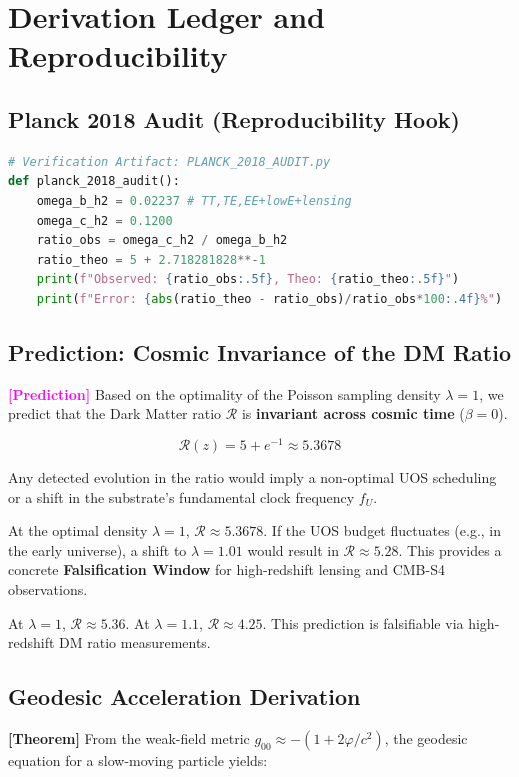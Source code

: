 \documentclass[11pt,titlepage]{article}
\newcommand{\tagtheo}{\textcolor{green!60!black}{\textbf{[Theorem]}} }
\newcommand{\tagpred}{\textcolor{magenta}{\textbf{[Prediction]}} }
\begin{document}
\section{Derivation Ledger and Reproducibility}

\subsection{Planck 2018 Audit (Reproducibility Hook)}
\begin{lstlisting}[language=Python]
# Verification Artifact: PLANCK_2018_AUDIT.py
def planck_2018_audit():
    omega_b_h2 = 0.02237 # TT,TE,EE+lowE+lensing
    omega_c_h2 = 0.1200
    ratio_obs = omega_c_h2 / omega_b_h2
    ratio_theo = 5 + 2.718281828**-1
    print(f"Observed: {ratio_obs:.5f}, Theo: {ratio_theo:.5f}")
    print(f"Error: {abs(ratio_theo - ratio_obs)/ratio_obs*100:.4f}%")
\end{lstlisting}



\subsection{Prediction: Cosmic Invariance of the DM Ratio}
\tagpred Based on the optimality of the Poisson sampling density $\lambda=1$, we predict that the Dark Matter ratio $\mathcal{R}$ is \textbf{invariant across cosmic time} ($\beta = 0$). 

\begin{equation}
\mathcal{R}(z) = 5 + e^{-1} \approx 5.3678
\end{equation}

Any detected evolution in the ratio would imply a non-optimal UOS scheduling or a shift in the substrate's fundamental clock frequency $f_U$.

At the optimal density $\lambda=1$, $\mathcal{R} \approx 5.3678$. If the UOS budget fluctuates (e.g., in the early universe), a shift to $\lambda=1.01$ would result in $\mathcal{R} \approx 5.28$. This provides a concrete \textbf{Falsification Window} for high-redshift lensing and CMB-S4 observations.

At $\lambda=1$, $\mathcal{R} \approx 5.36$. At $\lambda=1.1$, $\mathcal{R} \approx 4.25$. This prediction is falsifiable via high-redshift DM ratio measurements.

\subsection{Geodesic Acceleration Derivation}
\tagtheo From the weak-field metric $g_{00} \approx -(1 + 2\varphi/c^2)$, the geodesic equation for a slow-moving particle yields:
\end{document}
